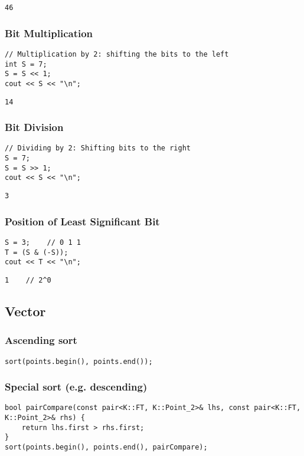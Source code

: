 \documentclass[11pt]{article}
\begin{document}
\begin{lstlisting}
46
\end{lstlisting}

\subsubsection{Bit Multiplication}
\begin{lstlisting}
// Multiplication by 2: shifting the bits to the left
int S = 7;
S = S << 1;
cout << S << "\n";
\end{lstlisting}

\begin{lstlisting}
14
\end{lstlisting}

\subsubsection{Bit Division}
\begin{lstlisting}
// Dividing by 2: Shifting bits to the right
S = 7;
S = S >> 1;
cout << S << "\n";
\end{lstlisting}

\begin{lstlisting}
3
\end{lstlisting}

\subsubsection{Position of Least Significant Bit}
\begin{lstlisting}
S = 3;    // 0 1 1
T = (S & (-S));
cout << T << "\n";
\end{lstlisting}

\begin{lstlisting}
1    // 2^0
\end{lstlisting}

\subsection{Vector}
\subsubsection{Ascending sort}
\begin{lstlisting}
sort(points.begin(), points.end());
\end{lstlisting}

\subsubsection{Special sort (e.g. descending)}
\begin{lstlisting}
bool pairCompare(const pair<K::FT, K::Point_2>& lhs, const pair<K::FT, K::Point_2>& rhs) {
    return lhs.first > rhs.first;
}
sort(points.begin(), points.end(), pairCompare);
\end{lstlisting}
\end{document}

